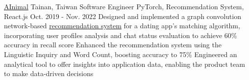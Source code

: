 \resumeExpEntry
{\href{https://ainimal.io}{AInimal}}
{Tainan, Taiwan}
{Software Engineer}
{PyTorch, Recommendation System, React.js}
{Oct. 2019 - Nov. 2022}
{
  \resumeItemListStart
    \resumeItem
    {Designed and implemented a graph convolution network-based \href{https://github.com/kuouu/dating-app-recsys}{recommendation system} for a dating app's matching algorithm, incorporating user profiles analysis and chat status evaluation to achieve 60\% accuracy in recall score}
    \resumeItem
    {Enhanced the recommendation system using the Linguistic Inquiry and Word Count, boosting accuracy to 75\%}
    \resumeItem
    {Engineered an analytical tool to offer insights into application data, enabling the product team to make data-driven decisions}
  \resumeItemListEnd
}

